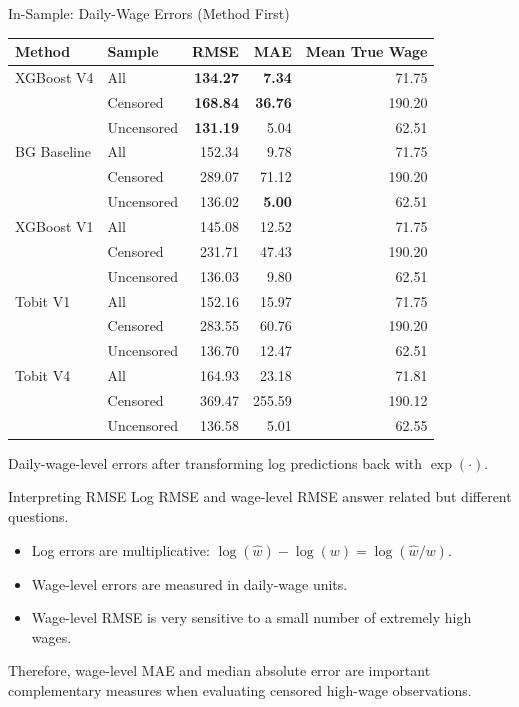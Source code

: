 \documentclass[10pt]{beamer}
\newcommand{\best}[1]{\cellcolor{yellow!40}\textbf{#1}}
\begin{document}
\begin{frame}{In-Sample: Daily-Wage Errors (Method First)}
\centering
\fontsize{5.5}{6.6}\selectfont
\begin{tabular}{llrrr}
\toprule
Method & Sample & RMSE & MAE & Mean True Wage \\
\midrule
XGBoost V4 & All & \best{134.27} & \best{7.34} & 71.75 \\
 & Censored & \best{168.84} & \best{36.76} & 190.20 \\
 & Uncensored & \best{131.19} & 5.04 & 62.51 \\
\midrule
BG Baseline & All & 152.34 & 9.78 & 71.75 \\
 & Censored & 289.07 & 71.12 & 190.20 \\
 & Uncensored & 136.02 & \best{5.00} & 62.51 \\
\midrule
XGBoost V1 & All & 145.08 & 12.52 & 71.75 \\
 & Censored & 231.71 & 47.43 & 190.20 \\
 & Uncensored & 136.03 & 9.80 & 62.51 \\
\midrule
Tobit V1 & All & 152.16 & 15.97 & 71.75 \\
 & Censored & 283.55 & 60.76 & 190.20 \\
 & Uncensored & 136.70 & 12.47 & 62.51 \\
\midrule
Tobit V4 & All & 164.93 & 23.18 & 71.81 \\
 & Censored & 369.47 & 255.59 & 190.12 \\
 & Uncensored & 136.58 & 5.01 & 62.55 \\
\bottomrule
\end{tabular}

\vspace{0.25cm}
\small
Daily-wage-level errors after transforming log predictions back with $\exp(\cdot)$.
\end{frame}



\begin{frame}{Interpreting RMSE}
Log RMSE and wage-level RMSE answer related but different questions.

\vspace{0.3cm}
\begin{itemize}
    \item Log errors are multiplicative: $\log(\hat{w})-\log(w)=\log(\hat{w}/w)$.
    \item Wage-level errors are measured in daily-wage units.
    \item Wage-level RMSE is very sensitive to a small number of extremely high wages.
\end{itemize}

\vspace{0.3cm}
Therefore, wage-level MAE and median absolute error are important complementary measures when evaluating censored high-wage observations.
\end{frame}
\end{document}
